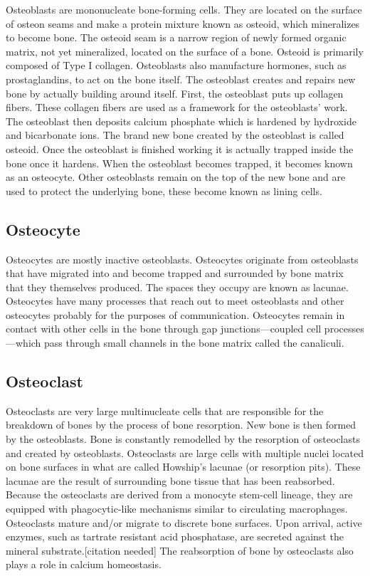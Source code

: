 Osteoblasts are mononucleate bone-forming cells. They are located on the surface of osteon seams and make a protein mixture known as osteoid, which mineralizes to become bone. The osteoid seam is a narrow region of newly formed organic matrix, not yet mineralized, located on the surface of a bone. Osteoid is primarily composed of Type I collagen. Osteoblasts also manufacture hormones, such as prostaglandins, to act on the bone itself. The osteoblast creates and repairs new bone by actually building around itself. First, the osteoblast puts up collagen fibers. These collagen fibers are used as a framework for the osteoblasts' work. The osteoblast then deposits calcium phosphate which is hardened by hydroxide and bicarbonate ions. The brand new bone created by the osteoblast is called osteoid. Once the osteoblast is finished working it is actually trapped inside the bone once it hardens. When the osteoblast becomes trapped, it becomes known as an osteocyte. Other osteoblasts remain on the top of the new bone and are used to protect the underlying bone, these become known as lining cells.

\hypertarget{osteocyte}{%
\subsection{Osteocyte}\label{osteocyte}}

Osteocytes are mostly inactive osteoblasts. Osteocytes originate from osteoblasts that have migrated into and become trapped and surrounded by bone matrix that they themselves produced. The spaces they occupy are known as lacunae. Osteocytes have many processes that reach out to meet osteoblasts and other osteocytes probably for the purposes of communication. Osteocytes remain in contact with other cells in the bone through gap junctions---coupled cell processes---which pass through small channels in the bone matrix called the canaliculi.

\hypertarget{osteoclast}{%
\subsection{Osteoclast}\label{osteoclast}}

Osteoclasts are very large multinucleate cells that are responsible for the breakdown of bones by the process of bone resorption. New bone is then formed by the osteoblasts. Bone is constantly remodelled by the resorption of osteoclasts and created by osteoblasts. Osteoclasts are large cells with multiple nuclei located on bone surfaces in what are called Howship's lacunae (or resorption pits). These lacunae are the result of surrounding bone tissue that has been reabsorbed. Because the osteoclasts are derived from a monocyte stem-cell lineage, they are equipped with phagocytic-like mechanisms similar to circulating macrophages. Osteoclasts mature and/or migrate to discrete bone surfaces. Upon arrival, active enzymes, such as tartrate resistant acid phosphatase, are secreted against the mineral substrate.{[}citation needed{]} The reabsorption of bone by osteoclasts also plays a role in calcium homeostasis.

